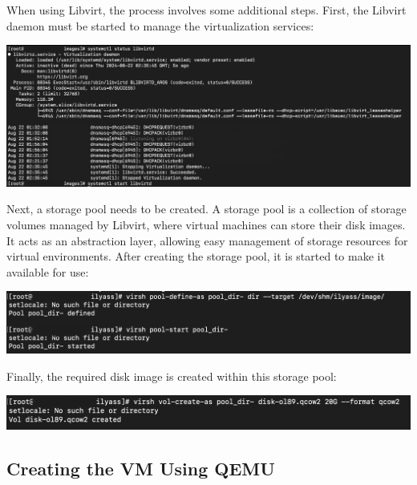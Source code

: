 When using Libvirt, the process involves some additional steps. First, the Libvirt daemon must be started to manage the virtualization services:

\begin{center}
    \centering
    \includegraphics[width=\textwidth]{Images/Starting Libvirtd.png}
    \label{fig:casa}
\end{center}

Next, a storage pool needs to be created. A storage pool is a collection of storage volumes managed by Libvirt, where virtual machines can store their disk images. It acts as an abstraction layer, allowing easy management of storage resources for virtual environments. After creating the storage pool, it is started to make it available for use:

\begin{center}
    \centering
    \includegraphics[width=\textwidth]{Images/Storage pool creation.png}
    \label{fig:casa}
\end{center}

Finally, the required disk image is created within this storage pool:

\begin{center}
    \centering
    \includegraphics[width=\textwidth]{Images/Disk Image Creation Libvirt.png}
    \label{fig:casa}
\end{center}

\subsection{Creating the VM Using QEMU}

